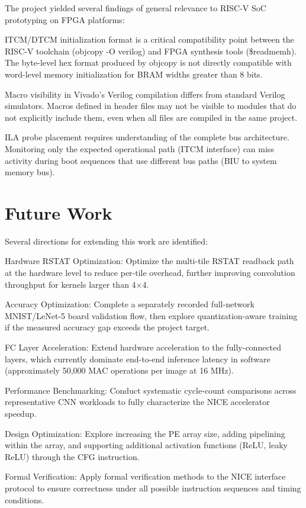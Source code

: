 The project yielded several findings of general relevance to RISC-V SoC prototyping on FPGA platforms:


ITCM/DTCM initialization format is a critical compatibility point between the RISC-V toolchain (objcopy -O verilog) and FPGA synthesis tools (\$readmemh). The byte-level hex format produced by objcopy is not directly compatible with word-level memory initialization for BRAM widths greater than 8 bits.


Macro visibility in Vivado's Verilog compilation differs from standard Verilog simulators. Macros defined in header files may not be visible to modules that do not explicitly include them, even when all files are compiled in the same project.


ILA probe placement requires understanding of the complete bus architecture. Monitoring only the expected operational path (ITCM interface) can miss activity during boot sequences that use different bus paths (BIU to system memory bus).


\section{Future Work}\label{sec:6_3}

Several directions for extending this work are identified:


Hardware RSTAT Optimization: Optimize the multi-tile RSTAT readback path at the hardware level to reduce per-tile overhead, further improving convolution throughput for kernels larger than 4$\times$4.


Accuracy Optimization: Complete a separately recorded full-network MNIST/LeNet-5 board validation flow, then explore quantization-aware training if the measured accuracy gap exceeds the project target.


FC Layer Acceleration: Extend hardware acceleration to the fully-connected layers, which currently dominate end-to-end inference latency in software (approximately 50,000 MAC operations per image at 16 MHz).


Performance Benchmarking: Conduct systematic cycle-count comparisons across representative CNN workloads to fully characterize the NICE accelerator speedup.


Design Optimization: Explore increasing the PE array size, adding pipelining within the array, and supporting additional activation functions (ReLU, leaky ReLU) through the CFG instruction.


Formal Verification: Apply formal verification methods to the NICE interface protocol to ensure correctness under all possible instruction sequences and timing conditions.


